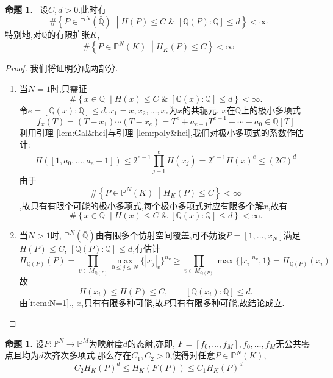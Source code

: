 \documentclass[12pt,A4paper,oneside,reqno]{amsart}
\numberwithin{equation}{section}
\theoremstyle{definition}
\newtheorem{proposition}[theorem]{命题}
\theoremstyle{plain}
\theoremstyle{plain}
\numberwithin{equation}{section}
\theoremstyle{remark}
\begin{document}
\begin{proposition}\
	设$C,d>0$.此时有
	$$\#\left\{P \in \mathbb{P}^N(\bar{\mathbb{Q}})\;\middle|H(P) \leqslant C \;\&\; [\mathbb{Q}(P):\mathbb{Q}]\leqslant d \right\} < \infty$$
	特别地,对$\mathbb{Q}$的有限扩张$K$,
	$$\#\left\{P \in \mathbb{P}^N(K)\;\middle|H_K(P) \leqslant C  \right\} < \infty$$
\end{proposition}
\begin{proof}我们将证明分成两部分.
	\begin{enumerate}[1.]
		\item \label{item:N=1}	当$N=1$时,只需证
		$$\#\left\{x \in \mathbb{Q}\;\middle|H(x) \leqslant C \;\&\; [\mathbb{Q}(x):\mathbb{Q}]\leqslant d \right\} < \infty.$$
		令$e=[\mathbb{Q}(x):\mathbb{Q}]\leqslant d, x_1=x,x_2,\ldots, x_e$为$x$的共轭元, $x$在$\mathbb{Q}$上的极小多项式
		$$f_x(T)=(T-x_1)\cdots (T-x_e)=T^e+a_{e-1}T^{e-1}+\cdots +a_0 \in \mathbb{Q}[T]$$
		利用引理 \ref{lem:Gal&hei}与引理 \ref{lem:poly&hei},我们对极小多项式的系数作估计:
		$$H([1,a_0, \ldots , a_e-1]) \leqslant 2^{e-1}\prod_{j-1}^{e}H(x_j)=2^{e-1}H(x)^e \leqslant (2C)^d$$
		由于$$\#\left\{P \in \mathbb{P}^N(K)\;\middle|H_K(P) \leqslant C  \right\} < \infty$$,故只有有限个可能的极小多项式,每个极小多项式对应有限多个解$x$,故有
		$$\#\left\{x \in \mathbb{Q}\;\middle|H(x) \leqslant C \;\&\; [\mathbb{Q}(x):\mathbb{Q}]\leqslant d \right\} < \infty.$$
		\item 当$N>1$时, $\mathbb{P}^N(\bar{\mathbb{Q}})$由有限多个仿射空间覆盖,可不妨设$P=[1,\ldots,x_N]$满足$H(P) \leqslant C$, $[\mathbb{Q}(P):\mathbb{Q}] \leqslant d$,有估计
		$$H_{\mathbb{Q}(P)}(P)=\prod_{v \in M_{\mathbb{Q}(P)}}\max_{0 \leqslant j \leqslant N} \{|x_j|_v\}^{n_v} \geqslant \prod_{v \in M_{\mathbb{Q}(P)}}\max\{|x_i|^{n_v},1\} =H_{\mathbb{Q}(P)}(x_i)$$
		故
		$$H(x_i) \leqslant H(P) \leqslant C, \qquad [\mathbb{Q}(x_i):\mathbb{Q}]\leqslant d.$$
		由\ref{item:N=1}., $x_i$只有有限多种可能,故$P$只有有限多种可能,故结论成立.
	\end{enumerate}
\end{proof}
\begin{proposition}\label{prop:map&hei}
	设$F:\mathbb{P}^N \longrightarrow \mathbb{P}^M$为映射度$d$的态射,亦即, $F=[f_0, \ldots , f_M], f_0, \ldots , f_M$无公共零点且均为$d$次齐次多项式,那么存在$C_1,C_2>0$,使得对任意$P \in \mathbb{P}^N(K), $
	$$C_2H_K(P)^d \leqslant H_K(F(P)) \leqslant C_1H_K(P)^d$$
\end{proposition}
\end{document}
